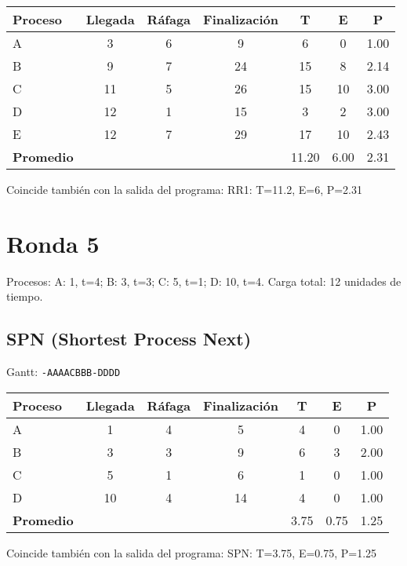 \documentclass[12pt]{article}
\begin{document}
\begin{center}
\begin{tabular}{lcccccc}
\toprule
\textbf{Proceso} & \textbf{Llegada} & \textbf{Ráfaga} & \textbf{Finalización} & \textbf{T} & \textbf{E} & \textbf{P} \\
\midrule
A & 3 & 6 & 9 & 6 & 0 & 1.00 \\
B & 9 & 7 & 24 & 15 & 8 & 2.14 \\
C & 11 & 5 & 26 & 15 & 10 & 3.00 \\
D & 12 & 1 & 15 & 3 & 2 & 3.00 \\
E & 12 & 7 & 29 & 17 & 10 & 2.43 \\
\midrule
\textbf{Promedio} & & & & 11.20 & 6.00 & 2.31 \\
\bottomrule
\end{tabular}
\end{center}

Coincide también con la salida del programa: RR1: T=11.2, E=6, P=2.31

\section*{Ronda 5}

Procesos: A: 1, t=4; B: 3, t=3; C: 5, t=1; D: 10, t=4.  
Carga total: 12 unidades de tiempo.  

\subsection*{SPN (Shortest Process Next)}

Gantt: \texttt{-AAAACBBB-DDDD}

\begin{center}
\begin{tabular}{lcccccc}
\toprule
\textbf{Proceso} & \textbf{Llegada} & \textbf{Ráfaga} & \textbf{Finalización} & \textbf{T} & \textbf{E} & \textbf{P} \\
\midrule
A & 1 & 4 & 5 & 4 & 0 & 1.00 \\
B & 3 & 3 & 9 & 6 & 3 & 2.00 \\
C & 5 & 1 & 6 & 1 & 0 & 1.00 \\
D & 10 & 4 & 14 & 4 & 0 & 1.00 \\
\midrule
\textbf{Promedio} & & & & 3.75 & 0.75 & 1.25 \\
\bottomrule
\end{tabular}
\end{center}

Coincide también con la salida del programa: SPN: T=3.75, E=0.75, P=1.25
\end{document}
